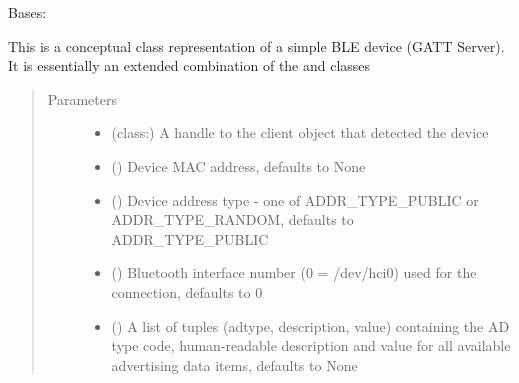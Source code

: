 \documentclass[letterpaper,10pt,english]{sphinxmanual}
\begin{document}
\begin{fulllineitems}
\label{\detokenize{PandaBot:PandaBot.PandaBotDevice}}
Bases: 

This is a conceptual class representation of a simple BLE device (GATT Server). It is essentially an extended combination of the  and  classes
\begin{quote}\begin{description}
\item[{Parameters}] \leavevmode\begin{itemize}
\item {} 
 (class:) \textendash{} A handle to the {\hyperref[\detokenize{PandaBot:PandaBot.PandaBotClient}]{}} client object that detected the device

\item {} 
 (\sphinxstyleliteralemphasis{\sphinxupquote{, }}) \textendash{} Device MAC address, defaults to None

\item {} 
 (\sphinxstyleliteralemphasis{\sphinxupquote{, }}) \textendash{} Device address type - one of ADDR\_TYPE\_PUBLIC or ADDR\_TYPE\_RANDOM, defaults to ADDR\_TYPE\_PUBLIC

\item {} 
 (\sphinxstyleliteralemphasis{\sphinxupquote{, }}) \textendash{} Bluetooth interface number (0 = /dev/hci0) used for the connection, defaults to 0

\item {} 
 (\sphinxstyleliteralemphasis{\sphinxupquote{, }}) \textendash{} A list of tuples (adtype, description, value) containing the AD type code, human-readable description and value for all available advertising data items, defaults to None


\end{itemize}
\end{description}
\end{quote}
\end{fulllineitems}
\end{document}
